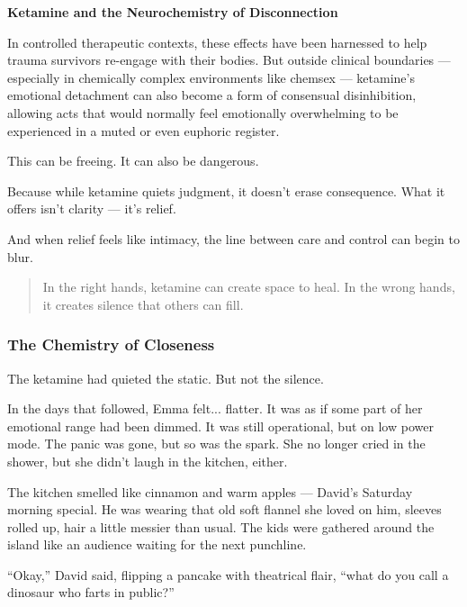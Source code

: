 \begin{TechnicalSidebar}{\textbf{Ketamine and the Neurochemistry of Disconnection}}
  \medskip
  
  In controlled therapeutic contexts, these effects have been harnessed to help trauma survivors re-engage 
  with their bodies. But outside clinical boundaries — especially in chemically complex environments like 
  chemsex — ketamine’s emotional detachment can also become a form of consensual disinhibition, allowing 
  acts that would normally feel emotionally overwhelming to be experienced in a muted or even euphoric 
  register.
  
  \medskip
  
  This can be freeing.
  It can also be dangerous.

  \medskip
  
  Because while ketamine quiets judgment, it doesn’t erase consequence. What it offers isn’t clarity 
  — it’s relief.

  \medskip
  
  And when relief feels like intimacy, the line between care and control can begin to blur.
  
  \begin{quote}
    In the right hands, ketamine can create space to heal.  
    In the wrong hands, it creates silence that others can fill.
  \end{quote}
  
\end{TechnicalSidebar}

\subsubsection{The Chemistry of Closeness}

The ketamine had quieted the static. But not the silence.

In the days that followed, Emma felt... flatter. It was as if some part of her emotional 
range had been dimmed. It was still operational, but on low power mode. The panic was gone, but so was the 
spark. She no longer cried in the shower, but she didn’t laugh in the kitchen, either.

The kitchen smelled like cinnamon and warm apples — David’s Saturday morning special. He was wearing that old soft flannel she loved on him, sleeves rolled up, hair a little messier than usual. The kids were gathered around the island like an audience waiting for the next punchline.

“Okay,” David said, flipping a pancake with theatrical flair, “what do you call a dinosaur who farts in public?”

